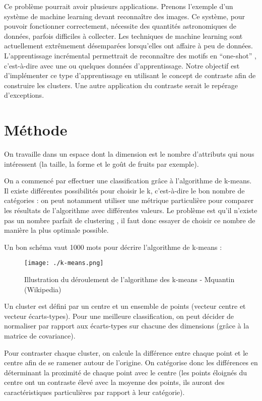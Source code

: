 \documentclass[a4paper,10pt]{article}
\begin{document}
Ce problème pourrait avoir plusieurs applications. Prenons l’exemple d’un système de machine learning devant reconnaître des images. Ce système, pour pouvoir fonctionner correctement, nécessite des quantités astronomiques de données, parfois difficiles à collecter. Les techniques de machine learning sont actuellement extrêmement désemparées lorsqu’elles ont affaire à peu de données. L’apprentissage incrémental permettrait de reconnaître des motifs en “one-shot” , c’est-à-dire avec une ou quelques données d’apprentissage. Notre objectif est d’implémenter ce type d’apprentissage en utilisant le concept de contraste afin de construire les clusters.
Une autre application du contraste serait le repérage d’exceptions.


\section{Méthode}

On travaille dans un espace dont la dimension est le nombre d’attributs qui nous intéressent (la taille, la forme et le goût de fruits par exemple).

On a commencé par effectuer une classification grâce à l’algorithme de k-means. Il existe différentes possibilités pour choisir le k, c’est-à-dire le bon nombre de catégories : on peut notamment utiliser une métrique particulière pour comparer les résultats de l’algorithme avec différentes valeurs. Le problème est qu'il n'existe pas un nombre parfait de clustering \cite{ref2}, il faut donc essayer de choisir ce nombre de manière la plus optimale possible.

\begin{flushleft}
Un bon schéma vaut 1000 mots pour décrire l’algorithme de k-means :
\end{flushleft}

\begin{figure}[h]
 \begin{center}
  \texttt{[image: ./k-means.png]}
 \end{center}
 \caption{Illustration du déroulement de l'algorithme des k-means - Mquantin (Wikipedia)}
\end{figure}

Un cluster est défini par un centre et un ensemble de points (vecteur centre et vecteur écarts-types).
Pour une meilleure classification, on peut décider de normaliser par rapport aux écarts-types sur chacune des dimensions (grâce à la matrice de covariance).

Pour contraster chaque cluster, on calcule la différence entre chaque point et le centre afin de se ramener autour de l’origine. On catégorise donc les différences en déterminant la proximité de chaque point avec le centre (les points éloignés du centre ont un contraste élevé avec la moyenne des points, ils auront des caractéristiques particulières par rapport à leur catégorie).
\end{document}
